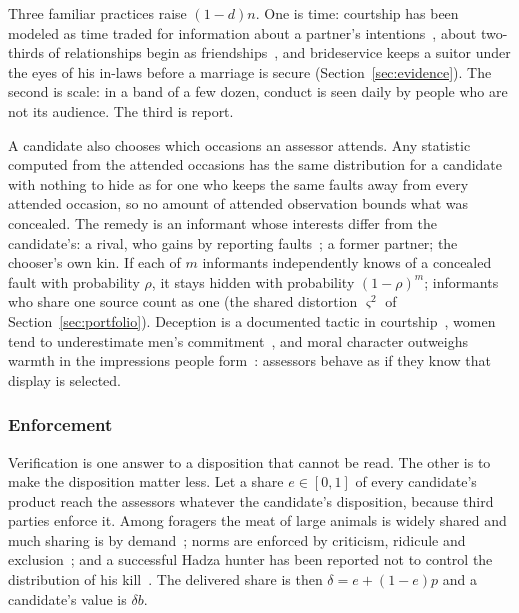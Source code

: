 Three familiar practices raise $(1-d)n$. One is time: courtship has been modeled as time traded for information about a
partner's intentions~\cite{wachtmeister1999,seymour2009,sozou2005}, about two-thirds of relationships begin as
friendships~\cite{stinson2022}, and brideservice keeps a suitor under the eyes of his in-laws before a marriage is secure
(Section~\ref{sec:evidence}). The second is scale: in a band of a few dozen, conduct is seen daily by people who are not
its audience. The third is report.

\begin{remark}
A candidate also chooses which occasions an assessor attends. Any statistic computed from the attended occasions has the
same distribution for a candidate with nothing to hide as for one who keeps the same faults away from every attended
occasion, so no amount of attended observation bounds what was concealed. The remedy is an informant whose interests differ
from the candidate's: a rival, who gains by reporting faults~\cite{buss1990}; a former partner; the chooser's own kin. If
each of $m$ informants independently knows of a concealed fault with probability $\rho$, it stays hidden with probability
$(1-\rho)^m$; informants who share one source count as one (the shared distortion $\varsigma^2$ of
Section~\ref{sec:portfolio}). Deception is a documented tactic in courtship~\cite{tooke1991}, women tend to underestimate
men's commitment~\cite{haselton2000}, and moral character outweighs warmth in the impressions people
form~\cite{goodwin2014}: assessors behave as if they know that display is selected.
\end{remark}

\subsubsection{Enforcement} Verification is one answer to a disposition that cannot be read. The other is to make the
disposition matter less. Let a share $e\in[0,1]$ of every candidate's product reach the assessors whatever the candidate's
disposition, because third parties enforce it. Among foragers the meat of large animals is widely shared and much sharing is
by demand~\cite{woodburn1982,peterson1993,gurven2004}; norms are enforced by criticism, ridicule and
exclusion~\cite{wiessner2005,boehm1999}; and a successful Hadza hunter has been reported not to control the distribution
of his kill~\cite{hawkes2001}. The delivered share is then $\delta=e+(1-e)p$ and a candidate's value is $\delta b$.

